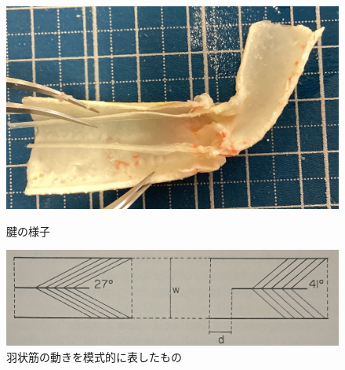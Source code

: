 \begin{figure}[t]
  \begin{minipage}[b]{0.4\hsize}
    \centering
    \includegraphics[scale=0.1]{image/setukanmaku.jpg}
    \caption{腱の様子\cite{hasegawa}}
    \label{fig:ken}
  \end{minipage}
  \begin{minipage}[b]{0.6\hsize}
    \centering
    \includegraphics[scale=0.18]{image/ujo.JPG}
    \caption{羽状筋の動きを模式的に表したもの\cite{warner1977biology}}
    \label{fig:ujo}
  \end{minipage}
\end{figure}
